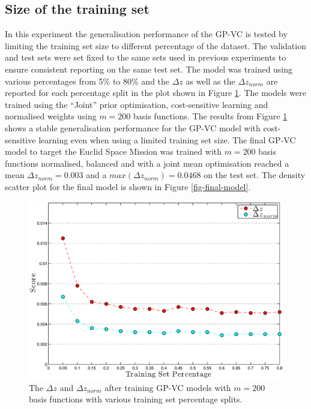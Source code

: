\documentclass[useAMS,usenatbib,fleqn]{mn2e}
\begin{document}
\subsection{Size of the training set}\label{sec-sizetraining}

In this experiment the generalisation performance of the GP-VC is tested by limiting the training set size to different percentage of the dataset. The validation and test sets were set fixed to the same sets used in previous experiments to ensure consistent reporting on the same test set. The model was trained using various percentages from 5\% to 80\% and the $\Delta z$ as well as the $\Delta z_{norm}$ are reported for each percentage split in the plot shown in Figure \ref{fig-training-percentage}. The models were trained using the ``Joint'' prior optimisation, cost-sensitive learning and normalised weights using $m=200$ basis functions. The results from Figure \ref{fig-training-percentage} shows a stable generalisation performance for the GP-VC model with cost-sensitive learning even when using a limited training set size. The final GP-VC model to target the Euclid Space Mission was trained with $m=200$ basis functions normalised, balanced and with a joint mean optimisation reached a mean $\Delta z_{norm}=0.003$ and a $max\left(\Delta z_{norm}\right)=0.0468$ on the test set. The density scatter plot for the final model is shown in Figure \ref{fig-final-model}.

\begin{figure}
       \centering
        \includegraphics[width=\columnwidth]{figures/percentage.eps}
        \caption{The $\Delta z$ and $\Delta z_{norm}$ after training GP-VC models with $m=200$ basis functions with various training set percentage splits. }
       \label{fig-training-percentage}
\end{figure}
\end{document}
